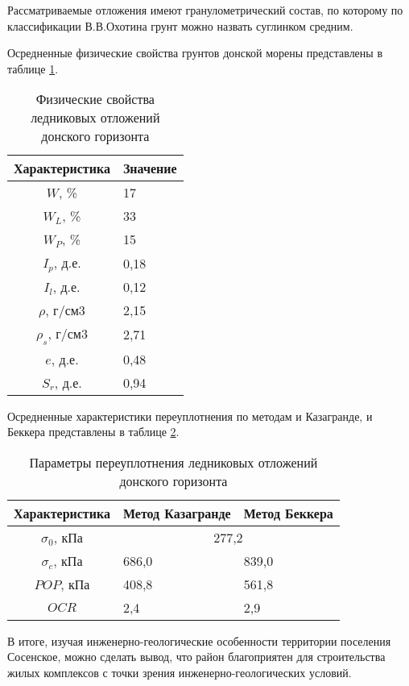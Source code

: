 Рассматриваемые отложения имеют 
гранулометрический состав, по которому по 
классификации В.В.Охотина грунт можно назвать 
суглинком средним. 

Осредненные физические свойства  грунтов 
донской морены представлены в таблице \ref{tab:donfiz}.

\begin{table}[]
  \small
  \centering
  \caption{Физические свойства ледниковых отложений донского горизонта}\label{tab:donfiz}
  \begin{tabular}{|c|l|}
  \hline
  \multicolumn{1}{|l|}{Характеристика} & Значение \\ \hline
  $W$, \%                                & 17       \\ \hline
  $W_L$, \%                               & 33       \\ \hline
  $W_P$, \%                               & 15       \\ \hline
  $I_p$, д.е.                             & 0,18     \\ \hline
  $I_l$, д.е.                             & 0,12     \\ \hline
  $\rho$, г/см3                             & 2,15     \\ \hline
  $\rho_s$, г/см3                            & 2,71     \\ \hline
  $e$, д.е.                              & 0,48     \\ \hline
  $S_r$, д.е.                             & 0,94     \\ \hline
  \end{tabular}
  \end{table}
 
 Осредненные характеристики 
 переуплотнения по методам и Казагранде, 
 и Беккера представлены в таблице \ref{tab:donmeh}.

 \begin{table}[]
  \small
  \centering
  \caption{Параметры переуплотнения ледниковых отложений донского горизонта}\label{tab:donmeh}
  \begin{tabular}{|c|l|l|}
  \hline
  \multicolumn{1}{|l|}{Характеристика} & Метод Казагранде & Метод Беккера \\ \hline
  $\sigma_0$, кПа                              & \multicolumn{2}{c|}{277,2}       \\ \hline
  $\sigma_c$, кПа                              & 686,0            & 839,0         \\ \hline
  $POP$, кПа                             & 408,8            & 561,8         \\ \hline
  $OCR$                                  & 2,4              & 2,9           \\ \hline
  \end{tabular}
  \end{table}

В итоге, изучая инженерно-геологические особенности территории поселения Сосенское, 
можно сделать вывод, что район благоприятен для строительства жилых комплексов 
с точки зрения инженерно-геологических условий. 